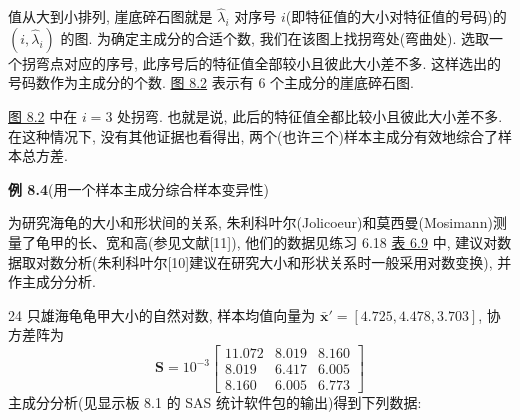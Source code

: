 
值从大到小排列, 崖底碎石图就是 $\hat{\lambda}_i$ 对序号 $i$(即特征值的大小对特征值的号码)的 $(i,\hat{\lambda}_i)$ 的图. 为确定主成分的合适个数, 我们在该图上找拐弯处(弯曲处). 选取一个拐弯点对应的序号, 此序号后的特征值全部较小且彼此大小差不多. 这样选出的号码数作为主成分的个数. \hyperref[fig:8.2]{图 8.2} 表示有 6 个主成分的崖底碎石图.

\begin{mvfigure}
\label{fig:8.2}
\end{mvfigure}

\hyperref[fig:8.2]{图 8.2} 中在 $i=3$ 处拐弯. 也就是说, 此后的特征值全都比较小且彼此大小差不多. 在这种情况下, 没有其他证据也看得出, 两个(也许三个)样本主成分有效地综合了样本总方差.

\noindent\textbf{例 8.4}\quad (用一个样本主成分综合样本变异性)

为研究海龟的大小和形状间的关系, 朱利科叶尔(Jolicoeur)和莫西曼(Mosimann)测量了龟甲的长、宽和高(参见文献[11]), 他们的数据见练习 6.18 \hyperref[tab:6.9]{表 6.9} 中, 建议对数据取对数分析(朱利科叶尔[10]建议在研究大小和形状关系时一般采用对数变换), 并作主成分分析.

24 只雄海龟龟甲大小的自然对数, 样本均值向量为 $\bar{\mathbf{x}}'=[4.725,4.478,3.703]$, 协方差阵为
\[
\mathbf{S}=10^{-3}\begin{bmatrix}
11.072&8.019&8.160\\
8.019&6.417&6.005\\
8.160&6.005&6.773
\end{bmatrix}
\]
主成分分析(见显示板 8.1 的 SAS 统计软件包的输出)得到下列数据:

